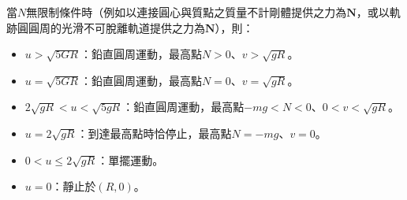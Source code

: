 \documentclass[a4paper,12pt]{article}
\begin{document}
當$N$無限制條件時（例如以連接圓心與質點之質量不計剛體提供之力為$\mathbf{N}$，或以軌跡圓圓周的光滑不可脫離軌道提供之力為$\mathbf{N}$），則：
\begin{itemize}
\item $u>\sqrt{5GR}$：鉛直圓周運動，最高點$N>0$、$v>\sqrt{gR}$。
\item $u=\sqrt{5GR}$：鉛直圓周運動，最高點$N=0$、$v=\sqrt{gR}$。
\item $2\sqrt{gR}<u<\sqrt{5gR}$：鉛直圓周運動，最高點$-mg<N<0$、$0<v<\sqrt{gR}$。
\item $u=2\sqrt{gR}$：到達最高點時恰停止，最高點$N=-mg$、$v=0$。
\item $0<u\leq2\sqrt{gR}$：單擺運動。
\item $u=0$：靜止於$(R,0)$。
\end{itemize}
\end{document}
